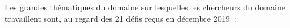 \documentclass[11pt]{article}
\begin{document}
Les grandes thématiques du domaine sur lesquelles les chercheurs du
domaine travaillent sont, au regard des 21 défis reçus en décembre 2019~: 
%
%
%
\end{document}
